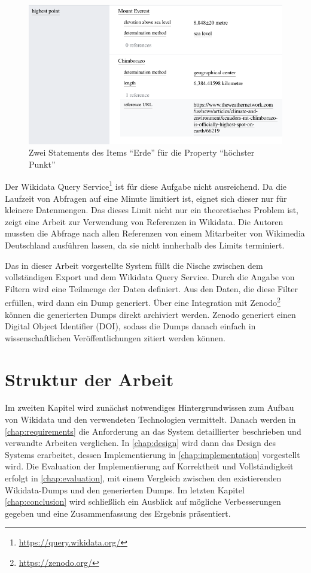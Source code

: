 \begin{figure}
  \includegraphics[width=\linewidth]{pics/example-statement}
  \caption{Zwei Statements des Items ``Erde'' für die Property ``höchster Punkt''}
  \label{fig:sample-statement}
\end{figure} 

Der Wikidata Query Service\footnote{\url{https://query.wikidata.org/}} ist für diese Aufgabe nicht ausreichend.
Da die Laufzeit von Abfragen auf eine Minute limitiert ist, eignet sich dieser nur für kleinere Datenmengen.
Das dieses Limit nicht nur ein theoretisches Problem ist, zeigt eine Arbeit zur Verwendung von Referenzen in Wikidata\cite{wd-wk-common-references}.
Die Autoren mussten die Abfrage nach allen Referenzen von einem Mitarbeiter von Wikimedia Deutschland ausführen lassen, da sie nicht innherhalb des Limits terminiert.

Das in dieser Arbeit vorgestellte System füllt die Nische zwischen dem vollständigen Export und dem Wikidata Query Service.
Durch die Angabe von Filtern wird eine Teilmenge der Daten definiert.
Aus den Daten, die diese Filter erfüllen, wird dann ein Dump generiert.
Über eine Integration mit Zenodo\footnote{\url{https://zenodo.org/}} können die generierten Dumps direkt archiviert werden.
Zenodo generiert einen Digital Object Identifier (DOI), sodass die Dumps danach einfach in wissenschaftlichen Veröffentlichungen zitiert werden können.

\section{Struktur der Arbeit}
Im zweiten Kapitel wird zunächst notwendiges Hintergrundwissen zum Aufbau von Wikidata und den verwendeten Technologien vermittelt.
Danach werden in \cref{chap:requirements} die Anforderung an das System detaillierter beschrieben und verwandte Arbeiten verglichen.
In \cref{chap:design} wird dann das Design des Systems erarbeitet, dessen Implementierung in \cref{chap:implementation} vorgestellt wird.
Die Evaluation der Implementierung auf Korrektheit und Vollständigkeit erfolgt in \cref{chap:evaluation}, mit einem  Vergleich zwischen den existierenden Wikidata-Dumps und den generierten Dumps.
Im letzten Kapitel \cref{chap:conclusion} wird schließlich ein Ausblick auf mögliche Verbesserungen gegeben und eine Zusammenfassung des Ergebnis präsentiert.

